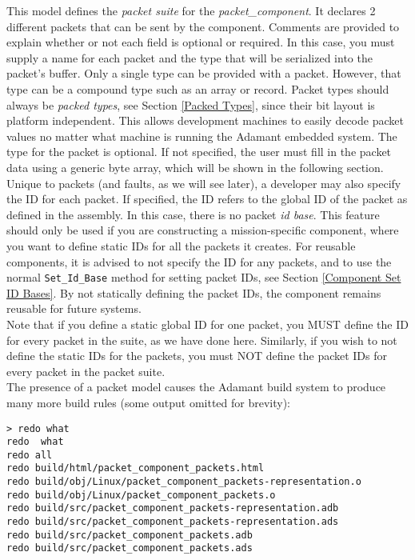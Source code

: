 This model defines the \textit{packet suite} for the \textit{packet\_component}. It declares 2 different packets that can be sent by the component. Comments are provided to explain whether or not each field is optional or required. In this case, you must supply a name for each packet and the type that will be serialized into the packet's buffer. Only a single type can be provided with a packet. However, that type can be a compound type such as an array or record. Packet types should always be \textit{packed types}, see Section \ref{Packed Types}, since their bit layout is platform independent. This allows development machines to easily decode packet values no matter what machine is running the Adamant embedded system. The type for the packet is optional. If not specified, the user must fill in the packet data using a generic byte array, which will be shown in the following section. \\

Unique to packets (and faults, as we will see later), a developer may also specify the ID for each packet. If specified, the ID refers to the global ID of the packet as defined in the assembly. In this case, there is no packet \textit{id base}. This feature should only be used if you are constructing a mission-specific component, where you want to define static IDs for all the packets it creates. For reusable components, it is advised to not specify the ID for any packets, and to use the normal \texttt{Set\_Id\_Base} method for setting packet IDs, see Section \ref{Component Set ID Bases}. By not statically defining the packet IDs, the component remains reusable for future systems. \\

Note that if you define a static global ID for one packet, you MUST define the ID for every packet in the suite, as we have done here. Similarly, if you wish to not define the static IDs for the packets, you must NOT define the packet IDs for every packet in the packet suite. \\

The presence of a packet model causes the Adamant build system to produce many more build rules (some output omitted for brevity):

\vspace{5mm} %
\begin{verbatim}
> redo what 
redo  what
redo all
redo build/html/packet_component_packets.html
redo build/obj/Linux/packet_component_packets-representation.o
redo build/obj/Linux/packet_component_packets.o
redo build/src/packet_component_packets-representation.adb
redo build/src/packet_component_packets-representation.ads
redo build/src/packet_component_packets.adb
redo build/src/packet_component_packets.ads
\end{verbatim}
\vspace{5mm} %

